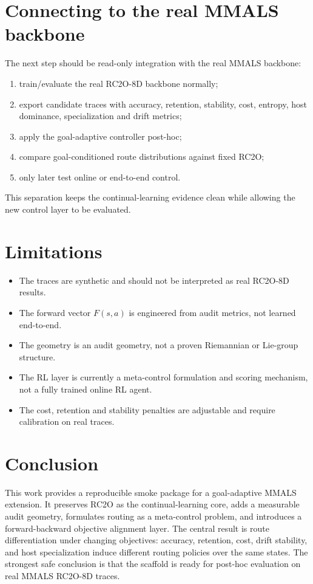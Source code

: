 \documentclass[11pt,a4paper]{article}
\begin{document}
\section{Connecting to the real MMALS backbone}
The next step should be read-only integration with the real MMALS backbone:
\begin{enumerate}[leftmargin=*]
    \item train/evaluate the real RC2O-8D backbone normally;
    \item export candidate traces with accuracy, retention, stability, cost, entropy, host dominance, specialization and drift metrics;
    \item apply the goal-adaptive controller post-hoc;
    \item compare goal-conditioned route distributions against fixed RC2O;
    \item only later test online or end-to-end control.
\end{enumerate}
This separation keeps the continual-learning evidence clean while allowing the new control layer to be evaluated.

\section{Limitations}
\begin{itemize}[leftmargin=*]
    \item The traces are synthetic and should not be interpreted as real RC2O-8D results.
    \item The forward vector $F(s,a)$ is engineered from audit metrics, not learned end-to-end.
    \item The geometry is an audit geometry, not a proven Riemannian or Lie-group structure.
    \item The RL layer is currently a meta-control formulation and scoring mechanism, not a fully trained online RL agent.
    \item The cost, retention and stability penalties are adjustable and require calibration on real traces.
\end{itemize}

\section{Conclusion}
This work provides a reproducible smoke package for a goal-adaptive MMALS extension. It preserves RC2O as the continual-learning core, adds a measurable audit geometry, formulates routing as a meta-control problem, and introduces a forward-backward objective alignment layer. The central result is route differentiation under changing objectives: accuracy, retention, cost, drift stability, and host specialization induce different routing policies over the same states. The strongest safe conclusion is that the scaffold is ready for post-hoc evaluation on real MMALS RC2O-8D traces.
\end{document}
